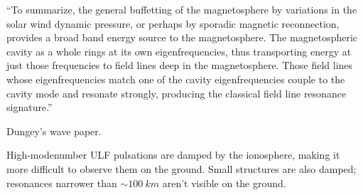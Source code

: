 



``To summarize, the general buffetting of the magnetosphere by variations in the solar wind dynamic pressure, or perhaps by sporadic magnetic reconnection, provides a broad band energy source to the magnetosphere. The magnetospheric cavity as a whole rings at its own eigenfrequencies, thus transporting energy at just those frequencies to field lines deep in the magnetosphere. Those field lines whose eigenfrequencies match one of the cavity eigenfrequencies couple to the cavity mode and resonate strongly, producing the classical field line resonance signature.\cite{hughes_1994}'' 


Dungey's \Alfven wave paper\cite{dungey_1954}. 

High-modenumber ULF pulsations are damped by the ionosphere, making it more difficult to observe them on the ground\cite{hughes_1976}. Small structures are also damped; resonances narrower than $\sim \SI{100}{km}$ aren't visible on the ground. 

